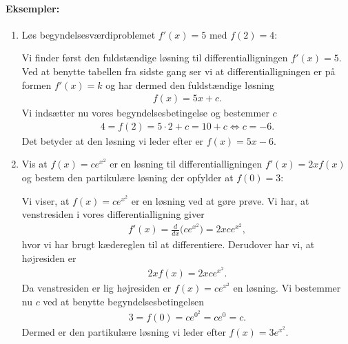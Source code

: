 \paragraph*{Eksempler:}
\begin{enumerate}
\item Løs begyndelsesværdiproblemet $f'(x)=5$ med $f(2)=4$:

Vi finder først den fuldstændige løsning til differentialligningen $f'(x)=5$. Ved at benytte tabellen fra sidste gang ser vi at differentialligningen er på formen $f'(x)=k$ og har dermed den fuldstændige løsning
\begin{align*}
f(x)=5x+c.
\end{align*}
Vi indsætter nu vores begyndelsesbetingelse og bestemmer $c$
\begin{align*}
4=f(2)=5 \cdot 2 + c = 10 + c \Leftrightarrow c = -6.
\end{align*}
Det betyder at den løsning vi leder efter er $f(x)=5x-6$.

\item Vis at  $f(x)=ce^{x^2}$ er en løsning til differentialligningen $f'(x)=2xf(x)$ og bestem den partikulære løsning der opfylder at $f(0)=3$:

Vi viser, at $f(x)=ce^{x^2}$ er en løsning ved at gøre prøve. Vi har, at venstresiden i vores differentialligning giver
\begin{align*}
f'(x) = \frac{d}{dx} \big(ce^{x^2}\big) = 2xce^{x^2},
\end{align*}
hvor vi har brugt kædereglen til at differentiere. Derudover har vi, at højresiden er
\begin{align*}
2xf(x)=2xce^{x^2}.
\end{align*}
Da venstresiden er lig højresiden er $f(x)=ce^{x^2}$ en løsning. Vi bestemmer nu $c$ ved at benytte begyndelsesbetingelsen
\begin{align*}
3=f(0)=ce^{0^2}=ce^0=c.
\end{align*}
Dermed er den partikulære løsning vi leder efter $f(x)=3e^{x^2}$.
\end{enumerate}

